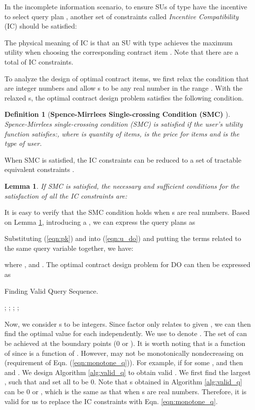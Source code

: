 \documentclass[journal]{IEEEtran}
\newtheorem{lemma}[theorem]{Lemma}
\newtheorem{definition}{Definition}
\begin{document}
In the incomplete information scenario, to ensure SUs of type  have the incentive to select query plan , another set of constraints called \emph{Incentive Compatibility} (IC) should be satisfied:

The physical meaning of IC is that an SU with type  achieves the maximum utility when choosing the corresponding contract item . Note that there are a total of  IC constraints.

To analyze the design of optimal contract items, we first relax the condition that  are integer numbers and allow s to be any real number in the range .
With the relaxed s, the optimal contract design problem satisfies the following condition.
\begin{definition}[\textbf{Spence-Mirrlees Single-crossing Condition (SMC)} \cite{contract_book}]
Spence-Mirrlees single-crossing condition (SMC) is satisfied if the user's utility function  satisfies:, where  is quantity of items,  is the price for  items and  is the type of user.
\end{definition}
When SMC is satisfied, the  IC constraints can be reduced to a set of tractable equivalent constraints \cite{contract_book}.
\begin{lemma}
\label{lemma:IC_incomplete}
If SMC is satisfied, the necessary and sufficient conditions for the satisfaction of all the IC constraints are:

\end{lemma}

It is easy to verify that the SMC condition holds when s are real numbers.
Based on Lemma \ref{lemma:IC_incomplete}, introducing a , we can express the query plans as

Substituting (\ref{eqn:pk}) and  into (\ref{eqn:u_do}) and putting the terms related to the same query variable together, we have:

where ,  and .
The optimal contract design problem for DO can then be expressed as


\begin{algorithm}[tp]
\caption {Finding Valid Query Sequence.}
\label{alg:valid_q}
\begin{algorithmic}[1]
\STATE ;
\WHILE {}
\STATE ;
\ENDWHILE
\STATE ; ;
\end{algorithmic}
\end{algorithm}

Now, we consider s to be integers. Since factor  only relates to  given , we can then find the optimal value for each  independently. We use  to denote . The set of  can be achieved at the boundary points (0 or ). It is worth noting that  is a function of  since  is a function of . However,  may not be monotonically nondecreasing on  (requirement of Eqn. (\ref{eqn:monotone_q})). For example, if for some ,  and  then  and . We design Algorithm \ref{alg:valid_q} to obtain valid . We first find the largest , such that  and set all  to be 0. Note that s obtained in Algorithm \ref{alg:valid_q} can be 0 or , which is the same as that when s are real numbers. Therefore, it is valid for us to replace the IC constraints with Eqn. \ref{eqn:monotone_q}.
\end{document}
